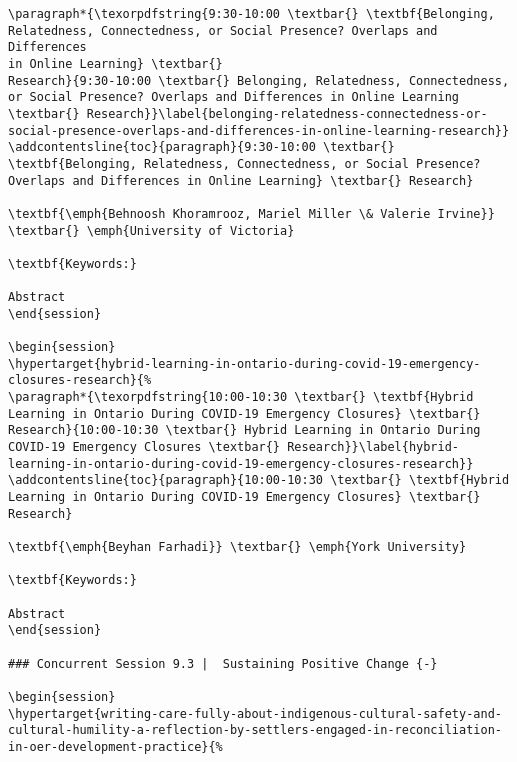 \documentclass[
]{book}
\begin{document}
\begin{verbatim}
\paragraph*{\texorpdfstring{9:30-10:00 \textbar{} \textbf{Belonging,
Relatedness, Connectedness, or Social Presence? Overlaps and Differences
in Online Learning} \textbar{}
Research}{9:30-10:00 \textbar{} Belonging, Relatedness, Connectedness, or Social Presence? Overlaps and Differences in Online Learning \textbar{} Research}}\label{belonging-relatedness-connectedness-or-social-presence-overlaps-and-differences-in-online-learning-research}}
\addcontentsline{toc}{paragraph}{9:30-10:00 \textbar{}
\textbf{Belonging, Relatedness, Connectedness, or Social Presence?
Overlaps and Differences in Online Learning} \textbar{} Research}

\textbf{\emph{Behnoosh Khoramrooz, Mariel Miller \& Valerie Irvine}}
\textbar{} \emph{University of Victoria}

\textbf{Keywords:}

Abstract
\end{session}

\begin{session}
\hypertarget{hybrid-learning-in-ontario-during-covid-19-emergency-closures-research}{%
\paragraph*{\texorpdfstring{10:00-10:30 \textbar{} \textbf{Hybrid
Learning in Ontario During COVID-19 Emergency Closures} \textbar{}
Research}{10:00-10:30 \textbar{} Hybrid Learning in Ontario During COVID-19 Emergency Closures \textbar{} Research}}\label{hybrid-learning-in-ontario-during-covid-19-emergency-closures-research}}
\addcontentsline{toc}{paragraph}{10:00-10:30 \textbar{} \textbf{Hybrid
Learning in Ontario During COVID-19 Emergency Closures} \textbar{}
Research}

\textbf{\emph{Beyhan Farhadi}} \textbar{} \emph{York University}

\textbf{Keywords:}

Abstract
\end{session}

### Concurrent Session 9.3 |  Sustaining Positive Change {-}

\begin{session}
\hypertarget{writing-care-fully-about-indigenous-cultural-safety-and-cultural-humility-a-reflection-by-settlers-engaged-in-reconciliation-in-oer-development-practice}{%

\end{verbatim}
\end{document}
